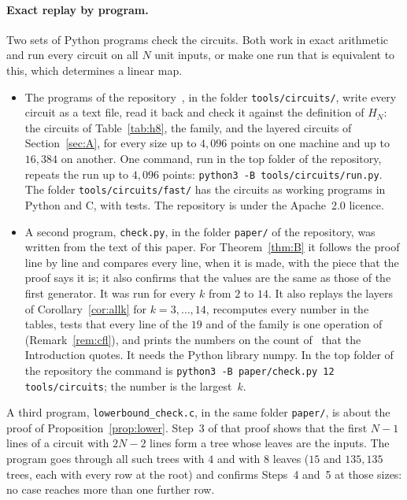 \documentclass[10pt]{article}
\theoremstyle{remark}
\begin{document}
\paragraph{Exact replay by program.}
Two sets of Python programs check the circuits. Both work in exact arithmetic and run every circuit on all
$N$ unit inputs, or make one run that is equivalent to this, which determines a linear map.
\begin{itemize}\setlength{\itemsep}{1pt}\setlength{\parskip}{0pt}
\item The programs of the repository~\cite{Repo}, in the folder \verb|tools/circuits/|, write every circuit
as a text file, read it back and check it against the definition of $H_N$: the circuits of
Table~\ref{tab:h8}, the family, and the layered circuits of Section~\ref{sec:A}, for every size up to
$4{,}096$ points on one machine and up to $16{,}384$ on another. One command, run in the top folder of the
repository, repeats the run up to $4{,}096$ points: \verb|python3 -B tools/circuits/run.py|. The folder \verb|tools/circuits/fast/| has the circuits as working
programs in Python and C, with tests. The repository is under the Apache~2.0 licence.
\item A second program, \verb|check.py|, in the folder \verb|paper/| of the repository, was written
from the text of this paper. For Theorem~\ref{thm:B} it
follows the proof line by line and compares every line, when it is made, with the piece that the proof
says it is; it also confirms that the values are the same as those of the first generator. It was run for
every $k$ from $2$ to $14$. It also replays the layers of Corollary~\ref{cor:allk} for $k=3,\dots,14$,
recomputes every number in the tables, tests that every line of the $19$ and of the family is one operation
of~\cite{CFL} (Remark~\ref{rem:cfl}), and prints the numbers on the count of~\cite{GA} that the Introduction
quotes. It needs the Python library numpy. In the top folder of the repository the command is
\verb|python3 -B paper/check.py 12 tools/circuits|; the number is the largest~$k$.
\end{itemize}
A third program, \verb|lowerbound_check.c|, in the same folder \verb|paper/|, is about the proof of
Proposition~\ref{prop:lower}. Step~3 of that proof shows that the first $N-1$ lines of a circuit with $2N-2$
lines form a tree whose leaves are the inputs. The program goes through all such trees with $4$ and with $8$
leaves ($15$ and $135{,}135$ trees, each with every row at the root) and confirms Steps~4 and~5 at those
sizes: no case reaches more than one further row.
\end{document}
